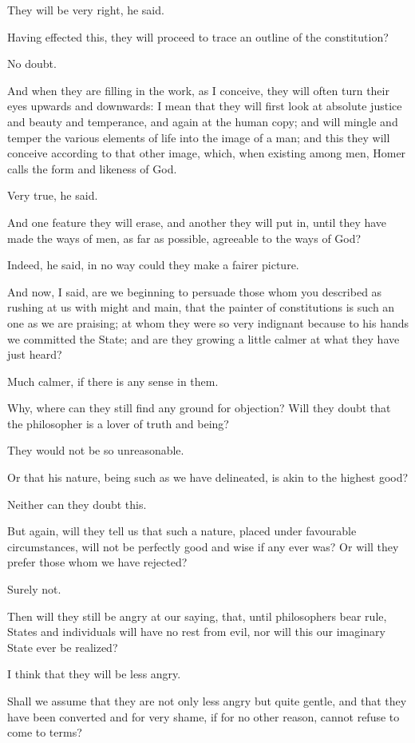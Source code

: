 They will be very right, he said.

Having effected this, they will proceed to trace an outline of the
constitution?

No doubt.

And when they are filling in the work, as I conceive, they will often
turn their eyes upwards and downwards: I mean that they will first look
at absolute justice and beauty and temperance, and again at the human
copy; and will mingle and temper the various elements of life into the
image of a man; and this they will conceive according to that other
image, which, when existing among men, Homer calls the form and likeness
of God.

Very true, he said.

And one feature they will erase, and another they will put in, until
they have made the ways of men, as far as possible, agreeable to the
ways of God?

Indeed, he said, in no way could they make a fairer picture.

And now, I said, are we beginning to persuade those whom you described
as rushing at us with might and main, that the painter of constitutions
is such an one as we are praising; at whom they were so very indignant
because to his hands we committed the State; and are they growing a
little calmer at what they have just heard?

Much calmer, if there is any sense in them.

Why, where can they still find any ground for objection? Will they doubt
that the philosopher is a lover of truth and being?

They would not be so unreasonable.

Or that his nature, being such as we have delineated, is akin to the
highest good?

Neither can they doubt this.

But again, will they tell us that such a nature, placed under favourable
circumstances, will not be perfectly good and wise if any ever was? Or
will they prefer those whom we have rejected?

Surely not.

Then will they still be angry at our saying, that, until philosophers
bear rule, States and individuals will have no rest from evil, nor will
this our imaginary State ever be realized?

I think that they will be less angry.

Shall we assume that they are not only less angry but quite gentle,
and that they have been converted and for very shame, if for no other
reason, cannot refuse to come to terms?

